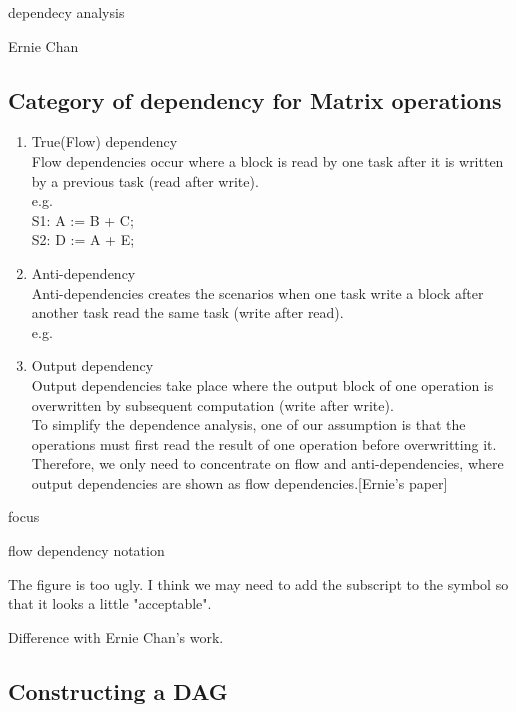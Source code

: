 \documentclass[preprint,11pt]{elsarticle}
\begin{document}

  dependecy analysis


  Ernie Chan


  \subsection{Category of dependency for Matrix operations}
  \begin{enumerate}
	\item True(Flow) dependency\\
  Flow dependencies occur where a block is read by one task after it is written by a previous task (read after write).\\
  e.g.\\
  S1: A := B + C;\\
  S2: D := A + E;\\


\item Anti-dependency\\
  Anti-dependencies creates the scenarios when one task write a block after another task read the same task (write after read).\\
  e.g.\\



\item Output dependency\\
  Output dependencies take place where the output block of one operation is overwritten by subsequent computation (write after write).\\


  To simplify the dependence analysis, one of our assumption is that the operations must first read the result of one operation before overwritting it. Therefore, we only need to concentrate on flow and anti-dependencies, where output dependencies are shown as flow dependencies.[Ernie's paper]\\

  \end{enumerate}


  focus

  flow dependency notation


  The figure is too ugly. I think we may need to add the subscript to the symbol so that it looks a little "acceptable".



  Difference with Ernie Chan's work.

  \subsection{Constructing a DAG}
\end{document}
